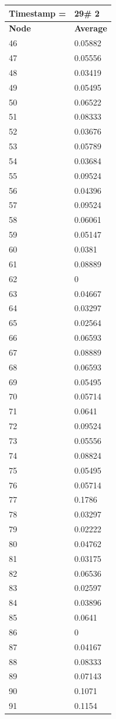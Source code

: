 \begin{tabular}{|l||l|}
\hline
\textbf{Timestamp =} & \textbf{29}\# 2\\\hline
	\textbf{Node} & \textbf{Average} \\ \hline
\hline
	46 & 0.05882 \\ \hline
	47 & 0.05556 \\ \hline
	48 & 0.03419 \\ \hline
	49 & 0.05495 \\ \hline
	50 & 0.06522 \\ \hline
	51 & 0.08333 \\ \hline
	52 & 0.03676 \\ \hline
	53 & 0.05789 \\ \hline
	54 & 0.03684 \\ \hline
	55 & 0.09524 \\ \hline
	56 & 0.04396 \\ \hline
	57 & 0.09524 \\ \hline
	58 & 0.06061 \\ \hline
	59 & 0.05147 \\ \hline
	60 & 0.0381 \\ \hline
	61 & 0.08889 \\ \hline
	62 & 0 \\ \hline
	63 & 0.04667 \\ \hline
	64 & 0.03297 \\ \hline
	65 & 0.02564 \\ \hline
	66 & 0.06593 \\ \hline
	67 & 0.08889 \\ \hline
	68 & 0.06593 \\ \hline
	69 & 0.05495 \\ \hline
	70 & 0.05714 \\ \hline
	71 & 0.0641 \\ \hline
	72 & 0.09524 \\ \hline
	73 & 0.05556 \\ \hline
	74 & 0.08824 \\ \hline
	75 & 0.05495 \\ \hline
	76 & 0.05714 \\ \hline
	77 & 0.1786 \\ \hline
	78 & 0.03297 \\ \hline
	79 & 0.02222 \\ \hline
	80 & 0.04762 \\ \hline
	81 & 0.03175 \\ \hline
	82 & 0.06536 \\ \hline
	83 & 0.02597 \\ \hline
	84 & 0.03896 \\ \hline
	85 & 0.0641 \\ \hline
	86 & 0 \\ \hline
	87 & 0.04167 \\ \hline
	88 & 0.08333 \\ \hline
	89 & 0.07143 \\ \hline
	90 & 0.1071 \\ \hline
	91 & 0.1154 \\ \hline
\end{tabular}
